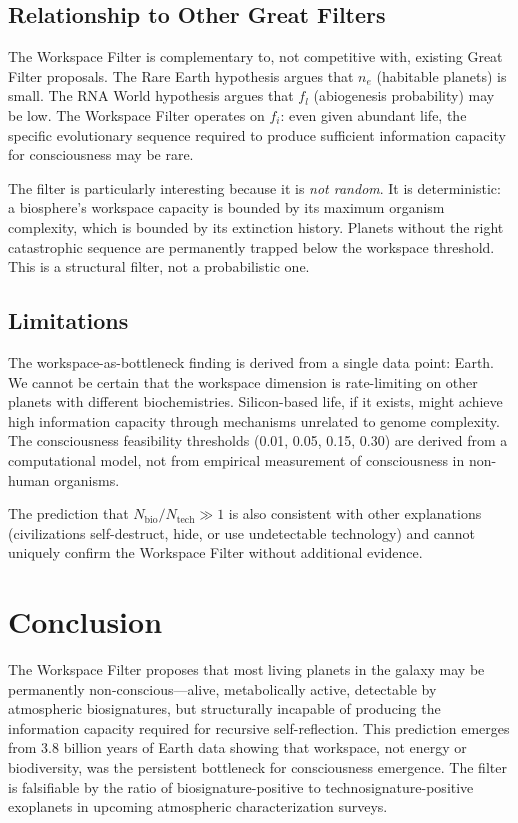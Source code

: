 \documentclass[10pt,letterpaper]{article}
\begin{document}
\subsection*{Relationship to Other Great Filters}

The Workspace Filter is complementary to, not competitive with, existing
Great Filter proposals. The Rare Earth hypothesis \cite{ward2000} argues
that $n_e$ (habitable planets) is small. The RNA World hypothesis
argues that $f_l$ (abiogenesis probability) may be low. The Workspace
Filter operates on $f_i$: even given abundant life, the specific
evolutionary sequence required to produce sufficient information
capacity for consciousness may be rare.

The filter is particularly interesting because it is \emph{not random}.
It is deterministic: a biosphere's workspace capacity is bounded by its
maximum organism complexity, which is bounded by its extinction history.
Planets without the right catastrophic sequence are permanently trapped
below the workspace threshold. This is a structural filter, not a
probabilistic one.

\subsection*{Limitations}

The workspace-as-bottleneck finding is derived from a single data point:
Earth. We cannot be certain that the workspace dimension is rate-limiting
on other planets with different biochemistries. Silicon-based life, if
it exists, might achieve high information capacity through mechanisms
unrelated to genome complexity. The consciousness feasibility thresholds
(0.01, 0.05, 0.15, 0.30) are derived from a computational model, not
from empirical measurement of consciousness in non-human organisms.

The prediction that $N_{\text{bio}} / N_{\text{tech}} \gg 1$ is also
consistent with other explanations (civilizations self-destruct, hide,
or use undetectable technology) and cannot uniquely confirm the Workspace
Filter without additional evidence.

\section*{Conclusion}

The Workspace Filter proposes that most living planets in the galaxy may
be permanently non-conscious---alive, metabolically active, detectable
by atmospheric biosignatures, but structurally incapable of producing
the information capacity required for recursive self-reflection. This
prediction emerges from 3.8 billion years of Earth data showing that
workspace, not energy or biodiversity, was the persistent bottleneck for
consciousness emergence. The filter is falsifiable by the ratio of
biosignature-positive to technosignature-positive exoplanets in upcoming
atmospheric characterization surveys.
\end{document}
